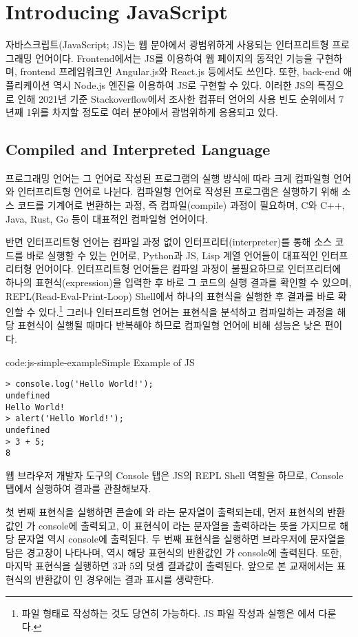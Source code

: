 \section{Introducing JavaScript}\label{sect:introducing-javascript}

자바스크립트(JavaScript; JS)는 웹 분야에서 광범위하게 사용되는 인터프리트형 프로그래밍 언어이다. Frontend에서는 JS를 이용하여 웹 페이지의 동적인 기능을 구현하며, frontend 프레임워크인 Angular.js와 React.js 등에서도 쓰인다. 또한, back-end 애플리케이션 역시 Node.js 엔진을 이용하여 JS로 구현할 수 있다. 이러한 JS의 특징으로 인해 2021년 기준 Stackoverflow에서 조사한 컴퓨터 언어의 사용 빈도 순위에서 7년째 1위를 차지할 정도로 여러 분야에서 광범위하게 응용되고 있다.

\subsection*{Compiled and Interpreted Language}

프로그래밍 언어는 그 언어로 작성된 프로그램의 실행 방식에 따라 크게 컴파일형 언어와 인터프리트형 언어로 나뉜다. 컴파일형 언어로 작성된 프로그램은 실행하기 위해 소스 코드를 기계어로 변환하는 과정, 즉 컴파일(compile) 과정이 필요하며, C와 C++, Java, Rust, Go 등이 대표적인 컴파일형 언어이다.

반면 인터프리트형 언어는 컴파일 과정 없이 인터프리터(interpreter)를 통해 소스 코드를 바로 실행할 수 있는 언어로, Python과 JS, Lisp 계열 언어들이 대표적인 인터프리터형 언어이다. 인터프리트형 언어들은 컴파일 과정이 불필요하므로 인터프리터에 하나의 표현식(expression)을 입력한 후 바로 그 코드의 실행 결과를 확인할 수 있으며, REPL(Read-Eval-Print-Loop) Shell에서 하나의 표현식을 실행한 후 결과를 바로 확인할 수 있다.\footnote{파일 형태로 작성하는 것도 당연히 가능하다. JS 파일 작성과 실행은 에서 다룬다.} 그러나 인터프리트형 언어는 표현식을 분석하고 컴파일하는 과정을 해당 표현식이 실행될 때마다 반복해야 하므로 컴파일형 언어에 비해 성능은 낮은 편이다.

\begin{codeenv}{code:js-simple-example}{Simple Example of JS}\begin{verbatim}
> console.log('Hello World!');
undefined
Hello World!
> alert('Hello World!');
undefined
> 3 + 5;
8
\end{verbatim}
\end{codeenv}

웹 브라우저 개발자 도구의 Console 탭은 JS의 REPL Shell 역할을 하므로, Console 탭에서 \을 실행하여 결과를 관찰해보자.

첫 번째 표현식을 실행하면 콘솔에 와 라는 문자열이 출력되는데, 먼저 표현식의 반환값인 가 console에 출력되고, 이 표현식이 라는 문자열을 출력하라는 뜻을 가지므로 해당 문자열 역시 console에 출력된다. 두 번째 표현식을 실행하면 브라우저에  문자열을 담은 경고창이 나타나며, 역시 해당 표현식의 반환값인 가 console에 출력된다. 또한, 마지막 표현식을 실행하면 3과 5의 덧셈 결과값이 출력된다. 앞으로 본 교재에서는 표현식의 반환값이 인 경우에는 결과 표시를 생략한다.

